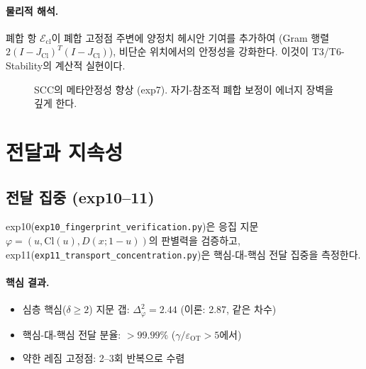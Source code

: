 \paragraph{물리적 해석.} 폐합 항 $\mathcal{E}_{\mathrm{cl}}$이 폐합 고정점 주변에 양정치 헤시안 기여를 추가하여 (Gram 행렬 $2(I - J_{\mathrm{Cl}})^T(I - J_{\mathrm{Cl}})$), 비단순 위치에서의 안정성을 강화한다. 이것이 T3/T6-Stability의 계산적 실현이다.

\begin{figure}[t]
\centering
{}
\caption{SCC의 메타안정성 향상 (exp7). 자기-참조적 폐합 보정이 에너지 장벽을 깊게 한다.}
\label{fig:allen-cahn-comparison}
\end{figure}


\section{전달과 지속성}
\label{sec:exp-transport}

\subsection{전달 집중 (exp10--11)}

exp10(\texttt{exp10\_fingerprint\_verification.py})은 응집 지문 $\varphi = (u, \mathrm{Cl}(u), D(x;1{-}u))$의 판별력을 검증하고, exp11(\texttt{exp11\_transport\_concentration.py})은 핵심-대-핵심 전달 집중을 측정한다.

\paragraph{핵심 결과.}
\begin{itemize}
    \item 심층 핵심($\delta \geq 2$) 지문 갭: $\Delta_\varphi^2 = 2.44$ (이론: 2.87, 같은 차수)
    \item 핵심-대-핵심 전달 분율: $> 99.99\%$ ($\gamma / \varepsilon_{\mathrm{OT}} > 5$에서)
    \item 약한 레짐 고정점: 2--3회 반복으로 수렴
\end{itemize}

